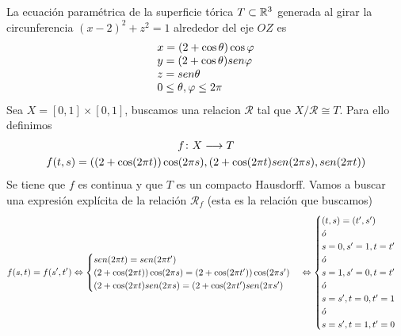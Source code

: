 \documentclass[GTS.tex]{subfiles}
\begin{document}
\begin{ej}[Toro]
La ecuación paramétrica de la superficie tórica $T\subset\mathbb{R}^3$ generada al girar la circunferencia $(x-2)^2+z^2=1$ alrededor del eje $OZ$ es
\[
\begin{array}{l}
x=(2+\cos\theta)\cos\varphi\\
y=(2+\cos\theta)sen \varphi\\
z=sen \theta\\
0\leq\theta,\varphi\leq 2\pi

\end{array}
\]
Sea $X=[0,1]\times[0,1]$, buscamos una relacion $\mathcal{R}$ tal que $X/\mathcal{R}\cong T$. Para ello definimos
\begin{gather*}
f\colon{X}\longrightarrow{T}\\
f(t,s)=((2+\cos(2\pi t))\cos(2\pi s), (2+\cos(2\pi t)sen (2\pi s), sen (2\pi t))
\end{gather*}
Se tiene que $f$ es continua y que $T$ es un compacto Hausdorff. Vamos a buscar una expresión explícita de la relación $\mathcal{R}_f$ (esta es la relación que buscamos)
\begin{gather*}
f(s,t)=f(s',t')\Leftrightarrow\begin{cases}
sen (2\pi t)=sen (2\pi t')\\
(2+\cos(2\pi t))\cos(2\pi s)=(2+\cos(2\pi t'))\cos(2\pi s')\\
(2+\cos(2\pi t)sen (2\pi s)=(2+\cos(2\pi t')sen (2\pi s')
\end{cases}\Leftrightarrow\begin{cases}
(t,s)=(t',s')\\
\acute{o}\\
s=0,s'=1, t=t'\\
\acute{o}\\
s=1,s'=0, t=t'\\
\acute{o}\\
s=s', t=0,t'=1\\
\acute{o}\\
s=s',t=1,t'=0
\end{cases}
\end{gather*}
\end{ej}
\end{document}
